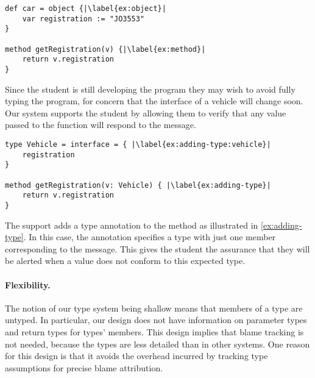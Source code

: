 \begin{lstlisting}[caption={The start of a simple program for tracking vehicle information.},label=lst:car-reg,escapechar=|,float,floatplacement=htbp]
def car = object {|\label{ex:object}|
    var registration := "JO3553"
}

method getRegistration(v) {|\label{ex:method}|
    return v.registration
}
\end{lstlisting}

Since the student is still developing the program they 
may wish to avoid fully typing the program,  
for concern that the interface of a vehicle will change soon. 
Our system supports the student by allowing them to verify
that any value passed to the  function will respond
to the  message. 


\begin{lstlisting}[label={ex:vehicle},caption={Adding a type annotation to a method parameter.},escapechar=|,float,floatplacement=htbp]
type Vehicle = interface = { |\label{ex:adding-type:vehicle}|
    registration    
}

method getRegistration(v: Vehicle) { |\label{ex:adding-type}|
    return v.registration
}
\end{lstlisting}

The support adds a type annotation to the method 
as illustrated in \cref{ex:adding-type}. 
In this case, 
the annotation specifies a type with just one member
corresponding to the  message.
This gives the student the assurance that they will be alerted when a value 
does not conform to this expected type.

\paragraph{Flexibility.}

The notion of our type system being shallow means 
that members of a type are untyped.
In particular, our design does not have information on parameter types
and return types for types' members.
This design implies that blame tracking is not needed,
because the types are less detailed than in other systems.
One reason for this design is that it avoids the overhead incurred
by tracking type assumptions for precise blame attribution.


